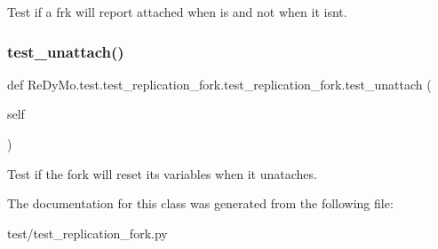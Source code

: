Test if a frk will report attached when is and not when it isn\textquotesingle{}t. 

\mbox{\label{classReDyMo_1_1test_1_1test__replication__fork_1_1test__replication__fork_a47ebd7572d932a0ac473c2c4e3b67d43}} 
\subsubsection{\texorpdfstring{test\+\_\+unattach()}{test\_unattach()}}
{\footnotesize\ttfamily def Re\+Dy\+Mo.\+test.\+test\+\_\+replication\+\_\+fork.\+test\+\_\+replication\+\_\+fork.\+test\+\_\+unattach (\begin{DoxyParamCaption}\item[{}]{self }\end{DoxyParamCaption})}



Test if the fork will reset its variables when it unataches. 



The documentation for this class was generated from the following file\+:\begin{DoxyCompactItemize}
\item 
test/test\+\_\+replication\+\_\+fork.\+py\end{DoxyCompactItemize}
